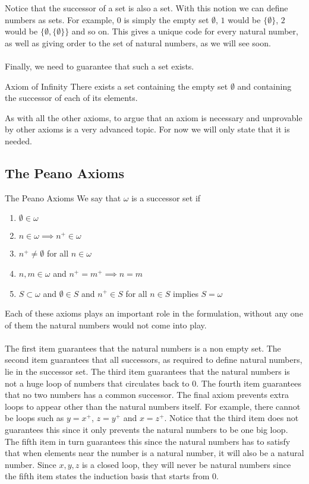 \documentclass[a4paper]{article}
\begin{document}
Notice that the successor of a set is also a set. With this notion we can define numbers as sets. For example, $0$ is simply the empty set $\emptyset$, $1$ would be $\{\emptyset\}$, $2$ would be $\{\emptyset,\{\emptyset\}\}$ and so on. This gives a unique code for every natural number, as well as giving order to the set of natural numbers, as we will see soon. \\~\\

Finally, we need to guarantee that such a set exists. 

\begin{axm}{Axiom of Infinity}{} There exists a set containing the empty set $\emptyset$ and containing the successor of each of its elements. 
\end{axm}

As with all the other axioms, to argue that an axiom is necessary and unprovable by other axioms is a very advanced topic. For now we will only state that it is needed. 

\subsection{The Peano Axioms}
\begin{defn}{The Peano Axioms}{} We say that $\omega$ is a successor set if
\begin{enumerate}
\item $\emptyset\in\omega$
\item $n\in\omega\implies n^+\in\omega$
\item $n^+\neq\emptyset$ for all $n\in\omega$
\item $n,m\in\omega$ and $n^+=m^+\implies n=m$
\item $S\subset\omega$ and $\emptyset\in S$ and $n^+\in S$ for all $n\in S$ implies $S=\omega$
\end{enumerate}
\end{defn}

Each of these axioms plays an important role in the formulation, without any one of them the natural numbers would not come into play. \\~\\

The first item guarantees that the natural numbers is a non empty set. The second item guarantees that all successors, as required to define natural numbers, lie in the successor set. The third item guarantees that the natural numbers is not a huge loop of numbers that circulates back to $0$. The fourth item guarantees that no two numbers has a common successor. The final axiom prevents extra loops to appear other than the natural numbers itself. For example, there cannot be loops such as $y=x^+$, $z=y^+$ and $x=z^+$. Notice that the third item does not guarantees this since it only prevents the natural numbers to be one big loop. The fifth item in turn guarantees this since the natural numbers has to satisfy that when elements near the number is a natural number, it will also be a natural number. Since $x,y,z$ is a closed loop, they will never be natural numbers since the fifth item states the induction basis that starts from $0$. \\~\\
\end{document}
